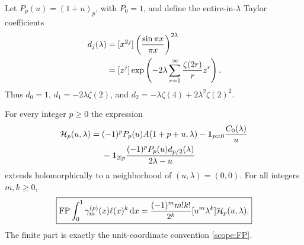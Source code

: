 Let $P_p(u)=(1+u)_p$, with $P_0=1$, and define the entire-in-$\lambda$
Taylor coefficients
\begin{align}\label{beta:d}
 d_j(\lambda)
 &=[x^{2j}]\left(\frac{\sin\pi x}{\pi x}\right)^{2\lambda}\notag\\
 &=[z^j]\exp\left(-2\lambda
                 \sum_{r=1}^{\infty}\frac{\zeta(2r)}r z^r\right).
\end{align}
Thus $d_0=1$, $d_1=-2\lambda\zeta(2)$, and
$d_2=-\lambda\zeta(4)+2\lambda^2\zeta(2)^2$.

\begin{theorem}\label{beta:completion}
For every integer $p\geq0$ the expression
\begin{align}\label{beta:Hp}
 \mathcal H_p(u,\lambda)
 ={}&(-1)^pP_p(u)A(1+p+u,\lambda)
       -\mathbf 1_{p=0}\frac{C_0(\lambda)}u\notag\\
 &-\mathbf 1_{2\mid p}
       \frac{(-1)^pP_p(u)d_{p/2}(\lambda)}{2\lambda-u}
\end{align}
extends holomorphically to a neighborhood of $(u,\lambda)=(0,0)$.
For all integers $m,k\geq0$,
\begin{equation}\label{beta:allmoments}
 \boxed{\displaystyle
 \operatorname{FP}\int_0^1\gamma_m^{(p)}(x)\ell(x)^k\,\mathrm d x
  =\frac{(-1)^m m!k!}{2^k}
      [u^m\lambda^k]\mathcal H_p(u,\lambda).}
\end{equation}
The finite part is exactly the unit-coordinate convention
\eqref{scope:FP}.
\end{theorem}

